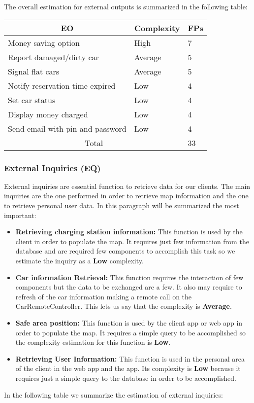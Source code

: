 \newpage
The overall estimation for external outputs is summarized in the following table: 
\begin{center}
\begin{tabular}{|l l l|}
\hline
\multicolumn{1}{|c}{EO}&Complexity&FPs\\
\hline
Money saving option &High & 7\\
Report damaged/dirty car & Average & 5\\
Signal flat cars &Average&5\\
Notify reservation time expired & Low&4\\
Set car status & Low&4\\
Display money charged& Low & 4\\
Send email with pin and password &  Low&4\\\hline
\multicolumn{2}{|c}{Total}&33\\
\hline
\end{tabular}
\end{center}

\subsubsection{External Inquiries (EQ)}
External inquiries are essential function to retrieve data for our clients. The main inquiries are the one performed in order to retrieve map information and the one to retrieve personal user data. In this paragraph will be summarized the most important:
\begin{itemize}
\item \textbf{Retrieving charging station information:} This function is used by the client in order to populate the map. It requires just few information from the database and are required few components to accomplish this task so we estimate the  inquiry as a \textbf{Low} complexity.
\item \textbf{Car information Retrieval:} This function requires the interaction of few components but the data to be exchanged are a few. It also may require to refresh of the car information making a remote call on the CarRemoteController. This lets us say that the complexity is \textbf{Average}.
\item \textbf{Safe area position:} This function is used by the client app or web app in order to populate the map. It requires a simple query to be accomplished so the complexity estimation for this function is \textbf{Low}.
\item \textbf{Retrieving User Information:} This function is used in the personal area of the client in the web app and the app. Its complexity is \textbf{Low} because it requires just a simple query to  the database in order to be accomplished.
\end{itemize}
In the following table we summarize the estimation of external inquiries: 

